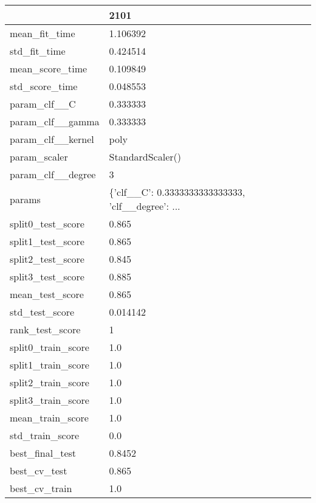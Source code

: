 \begin{tabular}{ll}
\toprule
{} &                                               2101 \\
\midrule
mean\_fit\_time      &                                           1.106392 \\
std\_fit\_time       &                                           0.424514 \\
mean\_score\_time    &                                           0.109849 \\
std\_score\_time     &                                           0.048553 \\
param\_clf\_\_C       &                                           0.333333 \\
param\_clf\_\_gamma   &                                           0.333333 \\
param\_clf\_\_kernel  &                                               poly \\
param\_scaler       &                                   StandardScaler() \\
param\_clf\_\_degree  &                                                  3 \\
params             &  \{'clf\_\_C': 0.3333333333333333, 'clf\_\_degree': ... \\
split0\_test\_score  &                                              0.865 \\
split1\_test\_score  &                                              0.865 \\
split2\_test\_score  &                                              0.845 \\
split3\_test\_score  &                                              0.885 \\
mean\_test\_score    &                                              0.865 \\
std\_test\_score     &                                           0.014142 \\
rank\_test\_score    &                                                  1 \\
split0\_train\_score &                                                1.0 \\
split1\_train\_score &                                                1.0 \\
split2\_train\_score &                                                1.0 \\
split3\_train\_score &                                                1.0 \\
mean\_train\_score   &                                                1.0 \\
std\_train\_score    &                                                0.0 \\
best\_final\_test    &                                             0.8452 \\
best\_cv\_test       &                                              0.865 \\
best\_cv\_train      &                                                1.0 \\
\bottomrule
\end{tabular}
